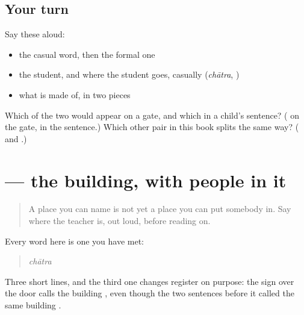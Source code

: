 \subsection*{Your turn}
Say these aloud:

\begin{itemize}
\raggedright
  \item the casual word, then the formal one
  \item the student, and where the student goes, casually (\emph{chātra}, )
  \item what  is made of, in two pieces
\end{itemize}

\begin{tcolorbox}[breakable,colback=teal!4,colframe=teal!35!black,title={Before you move on}]
Which of the two would appear on a gate, and which in a child's sentence? ( on the gate,  in the sentence.) Which other pair in this book splits the same way? ( and   .)
\end{tcolorbox}
\section[\texorpdfstring{\hi{शिक्षक} \hi{स्कूल} \hi{में} \hi{हैं} (śikṣak skūl meṁ haiṁ)}{शिक्षक स्कूल में हैं (śikṣak skūl meṁ haiṁ)}]{    — the building, with people in it}

\label{lesson:HI-C81-sintesis-skool}



\begin{quote}
A place you can name is not yet a place you can put somebody in. Say where the teacher is, out loud, before reading on.
\end{quote}

\begin{tcolorbox}[breakable,skin=enhanced,colback=orange!6,colframe=orange!45!black,boxrule=0.5pt,arc=1mm,left=6pt,right=6pt,top=4pt,bottom=4pt,fonttitle=\bfseries,title={Read this}]
Every word here is one you have met:

\begin{quote}
    \emph{chātra}       
\end{quote}

Three short lines, and the third one changes register on purpose: the sign over the door calls the building \textbf{}, even though the two sentences before it called the same building \textbf{}.
\end{tcolorbox}

